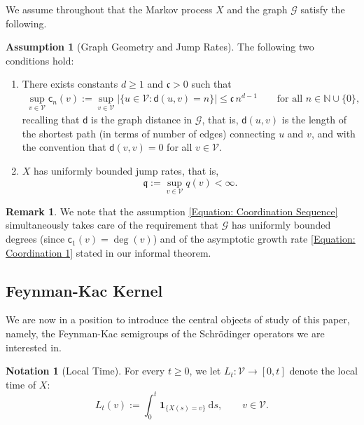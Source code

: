 \documentclass{amsart}
\numberwithin{equation}{section}
\theoremstyle{definition}
\newtheorem{assumption}[theorem]{Assumption}
\newtheorem{notation}[theorem]{Notation}
\newtheorem{remark}[theorem]{Remark}
\renewcommand\d{~\mathrm d}
\newcommand\mbb{\mathbb}
\newcommand\mbf{\mathbf}
\newcommand\mf{\mathfrak}
\newcommand\ms{\mathscr}
\newcommand\msf{\mathsf}
\begin{document}
%

We assume throughout that the Markov process $X$
and the graph $\ms G$ satisfy the following.

%

\begin{assumption}[Graph Geometry and Jump Rates]
\label{Assumption: Graph}
The following two conditions hold:
\begin{enumerate}
\item There exists constants $d\geq1$ and $\mf c>0$ such that
\begin{align}
\label{Equation: Coordination Sequence}
\sup_{v\in\ms V}\msf c_n(v):=\sup_{v\in\ms V}|\{u\in\ms V:\msf d(u,v)=n\}|\leq \mf c\,n^{d-1}\qquad\text{for all }n\in\mbb N\cup\{0\},
\end{align}
recalling that $\msf d$ is the graph distance in $\ms G$, that is, $\msf d(u,v)$
is the length of the shortest path (in terms of number of edges) connecting
$u$ and $v$, and with the convention that $\msf d(v,v)=0$ for all $v\in\ms V$.
\item $X$ has uniformly bounded jump rates, that is,
\[\displaystyle\mf q:=\sup_{v\in\ms V}q(v)<\infty.\]
\end{enumerate}
\end{assumption}

%

\begin{remark}
We note that the assumption \eqref{Equation: Coordination Sequence}
simultaneously takes care of the requirement that $\ms G$ has uniformly
bounded degrees (since $\msf c_1(v)=\deg(v)$) and of the asymptotic
growth rate \eqref{Equation: Coordination 1} stated in our informal theorem.
\end{remark}

%

\subsection{Feynman-Kac Kernel}

%

We are now in a position to introduce the central objects of study of this paper,
namely, the Feynman-Kac semigroups of the Schr\"odinger operators we
are interested in.

%

\begin{notation}[Local Time]
For every $t\geq0$, we let $L_t:\ms V\to[0,t]$ denote the local time of $X$:
\[L_t(v):=\int_0^t\mbf 1_{\{X(s)=v\}}\d s,\qquad v\in\ms V.\]
\end{notation}
\end{document}
